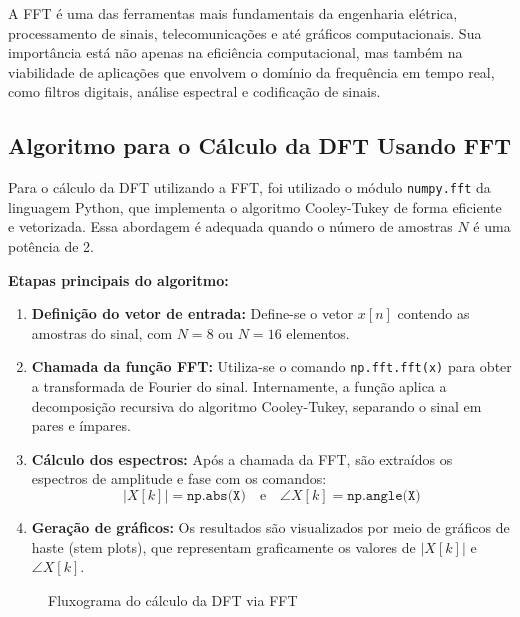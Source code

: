 \documentclass[12pt]{article}
\begin{document}
A FFT é uma das ferramentas mais fundamentais da engenharia elétrica, processamento de sinais, telecomunicações e até gráficos computacionais. Sua importância está não apenas na eficiência computacional, mas também na viabilidade de aplicações que envolvem o domínio da frequência em tempo real, como filtros digitais, análise espectral e codificação de sinais.

\newpage
\subsection{Algoritmo para o Cálculo da DFT Usando FFT}

Para o cálculo da DFT utilizando a FFT, foi utilizado o módulo \texttt{numpy.fft} da linguagem Python, que implementa o algoritmo Cooley-Tukey de forma eficiente e vetorizada. Essa abordagem é adequada quando o número de amostras $N$ é uma potência de 2.

\textbf{Etapas principais do algoritmo:}

\begin{enumerate}
    \item \textbf{Definição do vetor de entrada:} Define-se o vetor $x[n]$ contendo as amostras do sinal, com $N=8$ ou $N=16$ elementos.

    \item \textbf{Chamada da função FFT:} Utiliza-se o comando \texttt{np.fft.fft(x)} para obter a transformada de Fourier do sinal. Internamente, a função aplica a decomposição recursiva do algoritmo Cooley-Tukey, separando o sinal em pares e ímpares.

    \item \textbf{Cálculo dos espectros:} Após a chamada da FFT, são extraídos os espectros de amplitude e fase com os comandos:
    \[
    |X[k]| = \texttt{np.abs(X)} \quad \text{e} \quad \angle X[k] = \texttt{np.angle(X)}
    \]

    \item \textbf{Geração de gráficos:} Os resultados são visualizados por meio de gráficos de haste (stem plots), que representam graficamente os valores de $|X[k]|$ e $\angle X[k]$.
\end{enumerate}

\begin{figure}[H]
\centering
{}
\caption{Fluxograma do cálculo da DFT via FFT}
\end{figure}
\end{document}
